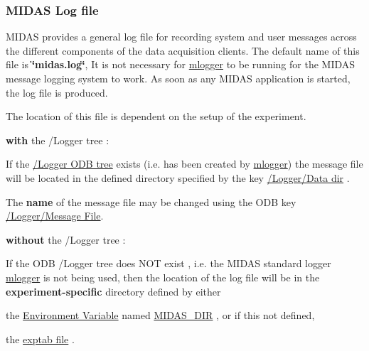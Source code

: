 \par
 \label{F_Messaging_idx_message_log-file}
\hypertarget{F_Messaging_idx_message_log-file}{}
 

 \hypertarget{F_Messaging_F_Log_File}{}\subsubsection{MIDAS Log file}\label{F_Messaging_F_Log_File}
MIDAS provides a general log file for recording system and user messages across the different components of the data acquisition clients. The default name of this file is {\bfseries \char`\"{}midas.log\char`\"{}}, It is not necessary for \hyperlink{F_Logging_F_mlogger_utility}{mlogger} to be running for the MIDAS message logging system to work. As soon as any MIDAS application is started, the log file is produced. \par
 \label{F_Messaging_idx_message_log-file_location}
\hypertarget{F_Messaging_idx_message_log-file_location}{}
 The location of this file is dependent on the setup of the experiment.


\begin{DoxyItemize}
\item {\bfseries with} the /Logger tree :
\begin{DoxyItemize}
\item If the \hyperlink{F_Logging_Data_F_Logger_tree}{/Logger ODB tree} exists (i.e. has been created by \hyperlink{F_Logging_F_mlogger_utility}{mlogger}) the message file will be located in the defined directory specified by the key \hyperlink{F_Logging_Data_F_Logger_Data_Dir}{/Logger/Data dir} .
\item The {\bfseries name} of the message file may be changed using the ODB key \hyperlink{F_Logging_Data_F_Logger_Message_File}{/Logger/Message File}.
\end{DoxyItemize}
\end{DoxyItemize}


\begin{DoxyItemize}
\item {\bfseries without} the /Logger tree :
\begin{DoxyItemize}
\item If the ODB /Logger tree does NOT exist , i.e. the MIDAS standard logger \hyperlink{F_Logging_F_mlogger_utility}{mlogger} is not being used, then the location of the log file will be in the {\bfseries  experiment-\/specific } directory defined by either
\begin{DoxyItemize}
\item the \hyperlink{BuildingOptions_BO_Environment_variables}{Environment Variable} named \hyperlink{BuildingOptions_BO_MIDAS_DIR}{MIDAS\_\-DIR} , or if this not defined,
\item the \hyperlink{Q_Linux_Q_Linux_Exptab}{exptab file} .
\end{DoxyItemize}
\end{DoxyItemize}
\end{DoxyItemize}

